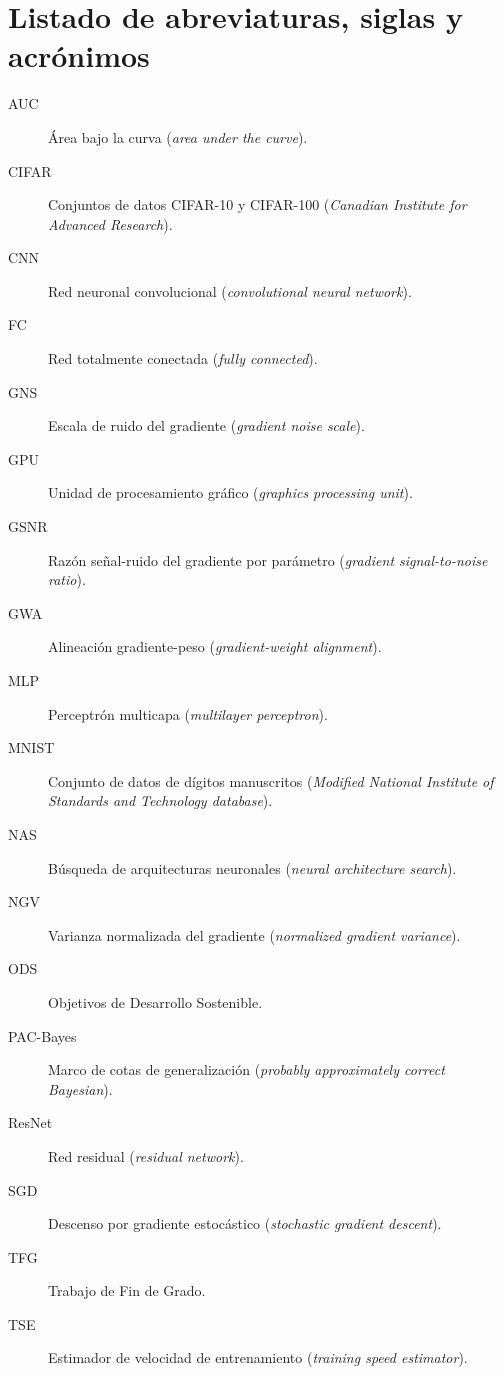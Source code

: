 \documentclass[11pt,spanish,listoffigures,listoftables]{tfgetsinf}
\begin{document}
\chapter*{Listado de abreviaturas, siglas y acrónimos}
\begin{description}
  \item[AUC] Área bajo la curva (\textit{area under the curve}).
  \item[CIFAR] Conjuntos de datos CIFAR-10 y CIFAR-100 (\textit{Canadian Institute for Advanced Research}).
  \item[CNN] Red neuronal convolucional (\textit{convolutional neural network}).
  \item[FC] Red totalmente conectada (\textit{fully connected}).
  \item[GNS] Escala de ruido del gradiente (\textit{gradient noise scale}).
  \item[GPU] Unidad de procesamiento gráfico (\textit{graphics processing unit}).
  \item[GSNR] Razón señal-ruido del gradiente por parámetro (\textit{gradient signal-to-noise ratio}).
  \item[GWA] Alineación gradiente-peso (\textit{gradient-weight alignment}).
  \item[MLP] Perceptrón multicapa (\textit{multilayer perceptron}).
  \item[MNIST] Conjunto de datos de dígitos manuscritos (\textit{Modified National Institute of Standards and Technology database}).
  \item[NAS] Búsqueda de arquitecturas neuronales (\textit{neural architecture search}).
  \item[NGV] Varianza normalizada del gradiente (\textit{normalized gradient variance}).
  \item[ODS] Objetivos de Desarrollo Sostenible.
  \item[PAC-Bayes] Marco de cotas de generalización (\textit{probably approximately correct Bayesian}).
  \item[ResNet] Red residual (\textit{residual network}).
  \item[SGD] Descenso por gradiente estocástico (\textit{stochastic gradient descent}).
  \item[TFG] Trabajo de Fin de Grado.
  \item[TSE] Estimador de velocidad de entrenamiento (\textit{training speed estimator}).
\end{description}

\mainmatter










\printbibliography[heading=bibintoc]
\cleardoublepage

\APPENDIX
\end{document}
